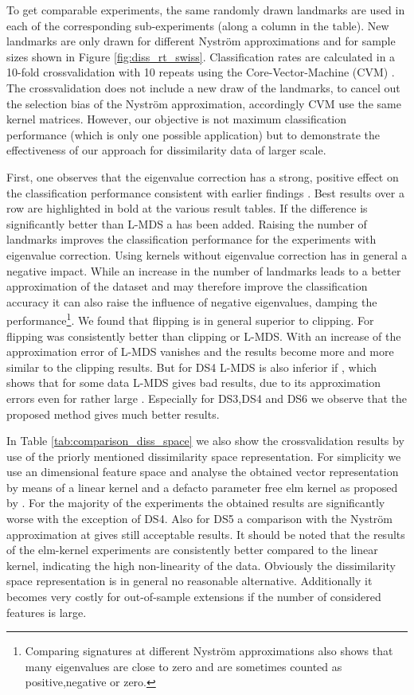\documentclass[twoside,11pt]{article}
\begin{document}
To get comparable experiments, the same randomly drawn landmarks are used in each of the corresponding sub-experiments
(along a column in the table). New landmarks are only drawn for different Nystr\"om approximations and for sample sizes shown in Figure \ref{fig:diss_rt_swiss}.
Classification rates are calculated in a 10-fold crossvalidation with 10 repeats using the Core-Vector-Machine (CVM) \cite{DBLP:conf/icml/TsangKK07}. 
The crossvalidation does not include a new draw of the landmarks, to cancel out the selection bias of the Nystr\"om approximation, accordingly CVM 
use the same kernel matrices. However, our objective is not maximum classification performance (which is only one possible
application) but to demonstrate the effectiveness of our approach for dissimilarity data of larger scale. 

First, one observes that the eigenvalue correction has a strong, positive effect
on the classification performance consistent with earlier findings \cite{DBLP:journals/jmlr/ChenGGRC09}. 
Best results over a row are highlighted in bold at the various result tables. If the difference is significantly better than L-MDS
a  has been added. 
Raising the number of landmarks improves the classification performance for the experiments with eigenvalue correction. 
Using kernels without eigenvalue correction has in general a negative impact. While an increase in the number of landmarks leads to a better
approximation of the dataset and may therefore improve the classification accuracy it can also raise the influence of negative eigenvalues,
damping the performance\footnote{Comparing signatures at different Nystr\"om approximations also shows that many 
eigenvalues are close to zero and are sometimes counted as positive,negative or zero.}. We  found that flipping is in general
superior to clipping. For  flipping was consistently better than clipping or L-MDS. With an increase of  the approximation error
of L-MDS vanishes and the results become more and more similar to the clipping results. But for DS4 L-MDS is also inferior if ,
which shows that for some data L-MDS gives bad results, due to its approximation errors even for rather large .
Especially for DS3,DS4 and DS6 we observe that the proposed method gives much better results.

In Table \ref{tab:comparison_diss_space} we also show the
crossvalidation results by use of the priorly mentioned dissimilarity space representation. For simplicity we use an  dimensional feature space 
and analyse the obtained vector representation by means of a linear kernel and a defacto parameter free elm kernel as proposed by \cite{DBLP:journals/ijon/FrenayV11}.
For the majority of the experiments the obtained results are significantly worse with the exception of DS4. Also for DS5 a comparison with the Nystr\"om
approximation at  gives still acceptable results. It should be noted that the results of the elm-kernel experiments are consistently better compared to
the linear kernel, indicating the high non-linearity of the data. Obviously the dissimilarity space representation is in general no reasonable alternative.
Additionally it becomes very costly for out-of-sample extensions if the number of considered features is large.
\end{document}
